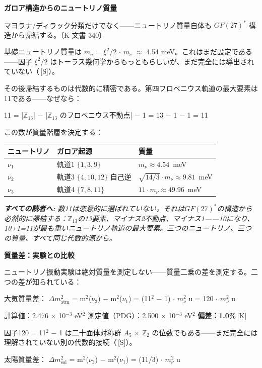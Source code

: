 \documentclass[11pt,openany]{book}
\newcommand{\status}[1]{\penalty10000\,{\tiny\textcolor{gray!70}{[#1]}}}
\newenvironment{laierspur}{%
  \par\vspace{4pt}%
  \noindent\small\itshape\color{blue!60!black}%
  \textbf{すべての読者へ:}\enspace\ignorespaces}{%
  \par\vspace{4pt}\normalsize\normalfont\normalcolor}
\begin{document}
\textbf{ガロア構造からのニュートリノ質量}

マヨラナ/ディラック分類だけでなく——ニュートリノ質量自体も $GF(27)^*$ 構造から帰結する。〔K 文書 340〕

基礎ニュートリノ質量は $m_
u$ = $\xi^2$/2 $\cdot$ $m_e$ $\approx$ 4.54 meV。これはまだ設定である——因子 $\xi^2$/2 はトーラス幾何学からもっともらしいが、まだ完全には導出されていない（\status{S}）。

その後帰結するものは代数的に精密である。第四フロベニウス軌道の最大要素は11である——なぜなら：

11 = |$\mathbb{Z}_{13}$| $-$ |$\mathbb{Z}_{13}$ のフロベニウス不動点| $-$ 1 = 13 $-$ 1 $-$ 1 = 11

この数が質量階層を決定する：

\begin{tabular}{lll}
\toprule
ニュートリノ & ガロア起源 & 質量 \\
\midrule
$\nu_1$ & 軌道1 $\{1,3,9\}$ & $m_\nu \approx 4.54$~meV \\
$\nu_2$ & 軌道3 $\{4,10,12\}$ 自己逆 & $\sqrt{14/3}\cdot m_\nu \approx 9.81$~meV \\
$\nu_3$ & 軌道4 $\{7,8,11\}$ & $11\cdot m_\nu \approx 49.96$~meV \\
\bottomrule
\end{tabular}

\begin{laierspur}
数11は恣意的に選ばれていない。それは$GF(27)^*$の構造から必然的に帰結する：$\mathbb{Z}_{13}$の13要素、マイナス2不動点、マイナス1——10になり、10+1=11が最も重いニュートリノ軌道の最大要素。三つのニュートリノ、三つの質量、すべて同じ代数的源から。
\end{laierspur}

\textbf{質量差：実験との比較}

ニュートリノ振動実験は絶対質量を測定しない——質量二乗の差を測定する。二つの差が知られている：

大気質量差：
$\Delta m^2_\text{atm}$ = m$^2$($\nu_3$) $-$ m$^2$($\nu_1$) = (11$^2$ $-$ 1) $\cdot$ $m_\nu^2$
u = 120 $\cdot$ $m_\nu^2$
u

計算値：2.476 $\times$ 10$^{-3}$ eV$^2$
測定値（PDG）：2.500 $\times$ 10$^{-3}$ eV$^2$
\textbf{偏差：1.0\%}\status{K}

因子120 = 11$^2$ $-$ 1 は二十面体対称群 $A_5$ × $\mathbb{Z}_2$ の位数でもある——まだ完全には理解されていない別の代数的接続（\status{S}）。

太陽質量差：
$\Delta m^2_\text{sol}$ = m$^2$($\nu_2$) $-$ m$^2$($\nu_1$) = (11/3) $\cdot$ $m_\nu^2$
u
\end{document}
